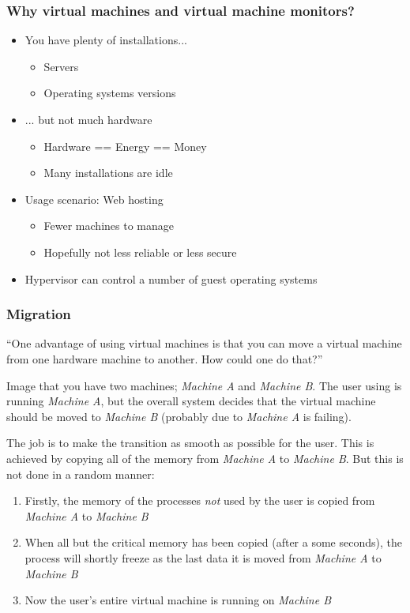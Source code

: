 
\subsubsection*{Why virtual machines and virtual machine monitors?}

\begin{itemize}
	\item You have plenty of installations...
	\begin{itemize}
		\item Servers
		\item Operating systems versions
	\end{itemize}

	\item ... but not much hardware
	\begin{itemize}
		\item Hardware == Energy == Money
		\item Many installations are idle
	\end{itemize}
	\item Usage scenario: Web hosting
	\begin{itemize}
		\item Fewer machines to manage
		\item Hopefully not less reliable or less secure
	\end{itemize}
	\item Hypervisor can control a number of guest operating systems
\end{itemize}

\subsubsection*{Migration}
``One advantage of using virtual machines is that you can move a virtual machine from one hardware machine to another. How could one do that?''

Image that you have two machines; \emph{Machine A} and \emph{Machine B}. The user using is running \emph{Machine A}, but the overall system decides that the virtual machine should be moved to \emph{Machine B} (probably due to \emph{Machine A} is failing).

The job is to make the transition as smooth as possible for the user. This is achieved by copying all of the memory from \emph{Machine A} to \emph{Machine B}. But this is not done in a random manner:
\begin{enumerate}
	\item Firstly, the memory of the processes \emph{not} used by the user is copied from \emph{Machine A} to \emph{Machine B}
	\item When all but the critical memory has been copied (after a some seconds), the process will shortly freeze as the last data it is moved from \emph{Machine A} to \emph{Machine B}
	\item Now the user's entire virtual machine is running on \emph{Machine B}
\end{enumerate}
